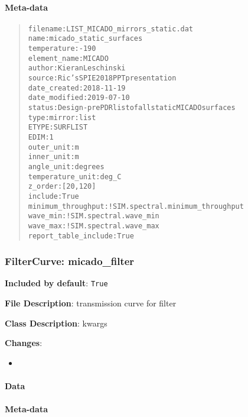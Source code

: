 \documentclass[a4paper]{article}
\begin{document}
\paragraph{Meta-data%
  \label{id16}%
}

\begin{quote}
\begin{alltt}
            filename : LIST_MICADO_mirrors_static.dat
                name : micado_static_surfaces
         temperature : -190
        element_name : MICADO
              author : Kieran Leschinski
              source : Ric's SPIE 2018 PPT presentation
        date_created : 2018-11-19
       date_modified : 2019-07-10
              status : Design - pre PDR list of all static MICADO surfaces
                type : mirror:list
               ETYPE : SURFLIST
                EDIM : 1
          outer_unit : m
          inner_unit : m
          angle_unit : degrees
    temperature_unit : deg_C
             z_order : [20, 120]
             include : True
  minimum_throughput : !SIM.spectral.minimum_throughput
            wave_min : !SIM.spectral.wave_min
            wave_max : !SIM.spectral.wave_max
report_table_include : True
\end{alltt}
\end{quote}


\subsubsection{FilterCurve: \textquotedbl{}micado\_filter\textquotedbl{}%
  \label{filtercurve-micado-filter}%
}

\textbf{Included by default}: \texttt{True}

\textbf{File Description}: transmission curve for filter

\textbf{Class Description}: kwargs

\textbf{Changes}:

\begin{itemize}
\item \end{itemize}


\paragraph{Data%
  \label{id17}%
}


\paragraph{Meta-data%
  \label{id18}%
}
\end{document}
